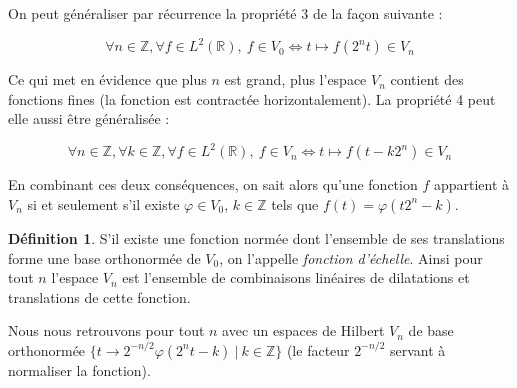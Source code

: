 \documentclass[]{article}
\theoremstyle{remark}
\newtheorem{myexmpl}{Exemple}
\theoremstyle{definition}
\newtheorem{mydef}{Définition}
\newcommand{\DS}{\displaystyle}
\begin{document}
	On peut généraliser par récurrence la propriété 3 de la façon suivante :
		
	$$\forall n \in \mathbb{Z}, \forall f \in L^2(\mathbb{R}), ~ f \in V_0 \Longleftrightarrow t \mapsto f \left(2^n t\right) \in V_{n}$$

	Ce qui met en évidence que plus $n$ est grand, plus l'espace $V_n$ contient des fonctions fines (la fonction est contractée horizontalement). La propriété 4 peut elle aussi être généralisée :
		
	$$\forall n \in \mathbb{Z}, \forall k \in \mathbb{Z}, \forall f \in L^2(\mathbb{R}), ~ f \in V_n \Longleftrightarrow t \mapsto f \left(t -k 2^n\right) \in V_{n}$$
	
	En combinant ces deux conséquences, on sait alors qu'une fonction $f$ appartient à $V_n$ si et seulement s'il existe $\varphi \in V_0$, $k \in \mathbb{Z}$ tels que $f(t) = \varphi (t 2^n - k)$.
	
	\begin{mydef}
		S'il existe une fonction normée dont l'ensemble de ses translations forme une base orthonormée de $V_0$, on l'appelle \textit{fonction d'échelle}. Ainsi pour tout $n$ l'espace $V_n$ est l'ensemble de combinaisons linéaires de dilatations et translations de cette fonction.
	\end{mydef}
	Nous nous retrouvons pour tout $n$ avec un espaces de Hilbert $V_n$ de base orthonormée $\{t \to 2^{-n/2} \varphi(2^n t - k) ~ | ~ k \in \mathbb{Z}\}$ (le facteur $2^{-n/2}$ servant à normaliser la fonction).
	
%		
%		
%		
%		
%		
%		
		
\end{document}
